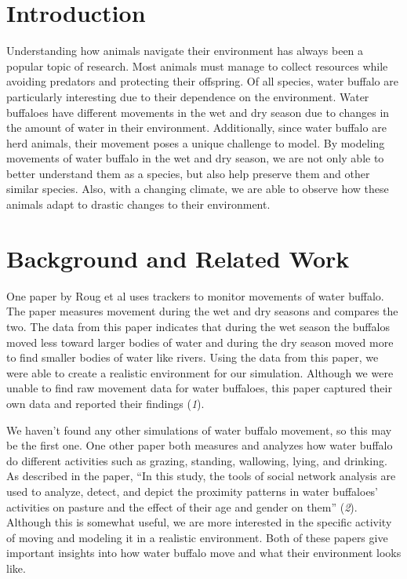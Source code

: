 \documentclass[12pt]{article}
\begin{document}
\section*{Introduction}

Understanding how animals navigate their environment has always been a popular topic of research. Most animals must manage to collect resources while avoiding predators and protecting their offspring. Of all species, water buffalo are particularly interesting due to their dependence on the environment. Water buffaloes have different movements in the wet and dry season due to changes in the amount of water in their environment. Additionally, since water buffalo are herd animals, their movement poses a unique challenge to model. By modeling movements of water buffalo in the wet and dry season, we are not only able to better understand them as a species, but also help preserve them and other similar species. Also, with a changing climate, we are able to observe how these animals adapt to drastic changes to their environment. 

\section*{Background and Related Work}

One paper by Roug et al uses trackers to monitor movements of water buffalo. The paper measures movement during the wet and dry seasons and compares the two. The data from this paper indicates that during the wet season the buffalos moved less toward larger bodies of water and during the dry season moved more to find smaller bodies of water like rivers. Using the data from this paper, we were able to create a realistic environment for our simulation. Although we were unable to find raw movement data for water buffaloes, this paper captured their own data and reported their findings ({\it 1}). 

We haven't found any other simulations of water buffalo movement, so this may be the first one.
One other paper both measures and analyzes how water buffalo do different activities such as grazing, standing, wallowing, lying, and drinking. As described in the paper, “In this study, the tools of social network analysis are used to analyze, detect, and depict the proximity patterns in water buffaloes' activities on pasture and the effect of their age and gender on them” ({\it 2}). Although this is somewhat useful, we are more interested in the specific activity of moving and modeling it in a realistic environment. Both of these papers give important insights into how water buffalo move and what their environment looks like.
\end{document}
